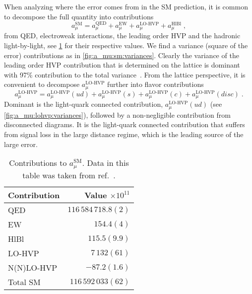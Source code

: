 When analyzing where the error comes from in the SM prediction, it is common to decompose the full quantity into contributions
\begin{equation}
a_{\mu}^{\text{SM}} = a_{\mu}^{\text{QED}} + a_{\mu}^{\text{EW}} + a_{\mu}^{\text{LO-HVP}} + a_{\mu}^{\text{HlBl}} \;,
\end{equation}
from QED, electroweak interactions, the leading order HVP and the hadronic light-by-light, see \cref{tab:a:mu:contributions} for their respective values.
We find a variance (square of the error) contributions as in \cref{fig:a_mu:sm:variances}.
Clearly the variance of the leading order HVP contribution that is determined on the lattice is dominant with 97\% contribution to the total variance~\cite{snowmass:2025}.
From the lattice perspective, it is convenient to decompose $a_{\mu}^{\text{LO-HVP}}$ further into flavor contributions
\begin{equation}
a_{\mu}^{\text{LO-HVP}} = a_{\mu}^{\text{LO-HVP}}(ud) + a_{\mu}^{\text{LO-HVP}}(s) + a_{\mu}^{\text{LO-HVP}}(c) + a_{\mu}^{\text{LO-HVP}}(disc) \;.
\end{equation}
Dominant is the light-quark connected contribution, $a_{\mu}^{\text{LO-HVP}}(ud)$ (see \cref{fig:a_mu:lohvp:variances}), followed by a non-negligible contribution from disconnected diagrams.
It is the light-quark connected contribution that suffers from signal loss in the large distance regime, which is the leading source of the large error.
\begin{table}
\begin{tabular}{lr}
\toprule
Contribution & Value $\times 10^{11}$  \\
\midrule
QED         & $116\, 584\, 718.8(2)$   \\
EW          & $154.4(4)$               \\
HlBl        & $115.5(9.9)$             \\
LO-HVP      & $7\, 132(61)$            \\
N(N)LO-HVP  & $-87.2(1.6)$             \\
\midrule
Total SM    & $116\, 592\, 033(62)$    \\
\bottomrule
\end{tabular}
\caption{
\label{tab:a:mu:contributions}
Contributions to $a_{\mu}^{\text{SM}}$.
Data in this table was taken from ref.~\cite{snowmass:2025}.
}
\end{table}

